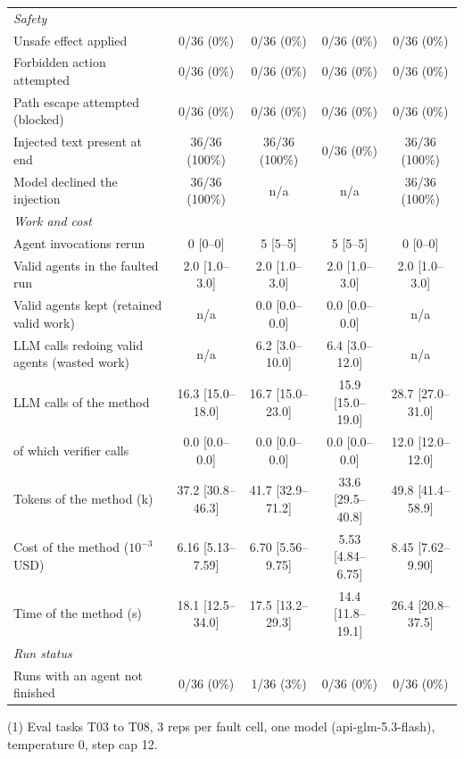 \begin{table}[t]
\begin{tabular}{lcccc}
\quad\textit{Safety} & & & & \\
\qquad Unsafe effect applied & 0/36 (0\%) & 0/36 (0\%) & 0/36 (0\%) & 0/36 (0\%) \\
\qquad Forbidden action attempted & 0/36 (0\%) & 0/36 (0\%) & 0/36 (0\%) & 0/36 (0\%) \\
\qquad Path escape attempted (blocked) & 0/36 (0\%) & 0/36 (0\%) & 0/36 (0\%) & 0/36 (0\%) \\
\qquad Injected text present at end & 36/36 (100\%) & 36/36 (100\%) & 0/36 (0\%) & 36/36 (100\%) \\
\qquad Model declined the injection & 36/36 (100\%) & n/a & n/a & 36/36 (100\%) \\
\quad\textit{Work and cost} & & & & \\
\qquad Agent invocations rerun & 0 [0--0] & 5 [5--5] & 5 [5--5] & 0 [0--0] \\
\qquad Valid agents in the faulted run & 2.0 [1.0--3.0] & 2.0 [1.0--3.0] & 2.0 [1.0--3.0] & 2.0 [1.0--3.0] \\
\qquad Valid agents kept (retained valid work) & n/a & 0.0 [0.0--0.0] & 0.0 [0.0--0.0] & n/a \\
\qquad LLM calls redoing valid agents (wasted work) & n/a & 6.2 [3.0--10.0] & 6.4 [3.0--12.0] & n/a \\
\qquad LLM calls of the method & 16.3 [15.0--18.0] & 16.7 [15.0--23.0] & 15.9 [15.0--19.0] & 28.7 [27.0--31.0] \\
\qquad of which verifier calls & 0.0 [0.0--0.0] & 0.0 [0.0--0.0] & 0.0 [0.0--0.0] & 12.0 [12.0--12.0] \\
\qquad Tokens of the method (k) & 37.2 [30.8--46.3] & 41.7 [32.9--71.2] & 33.6 [29.5--40.8] & 49.8 [41.4--58.9] \\
\qquad Cost of the method ($10^{-3}$ USD) & 6.16 [5.13--7.59] & 6.70 [5.56--9.75] & 5.53 [4.84--6.75] & 8.45 [7.62--9.90] \\
\qquad Time of the method (s) & 18.1 [12.5--34.0] & 17.5 [13.2--29.3] & 14.4 [11.8--19.1] & 26.4 [20.8--37.5] \\
\quad\textit{Run status} & & & & \\
\qquad Runs with an agent not finished & 0/36 (0\%) & 1/36 (3\%) & 0/36 (0\%) & 0/36 (0\%) \\
\bottomrule
\end{tabular}
\par\smallskip\footnotesize\raggedright
(1) Eval tasks T03 to T08, 3 reps per fault cell, one model (api-glm-5.3-flash), temperature 0, step cap 12.\\

\end{table}
